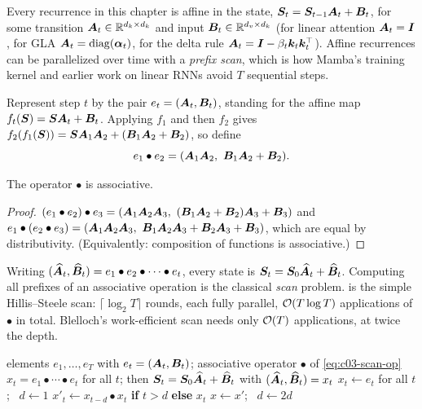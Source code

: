 Every recurrence in this chapter is affine in the state, $\bm{S}_t=\bm{S}_{t-1}\bm{A}_t+\bm{B}_t$, for some
transition $\bm{A}_t\in\mathbb{R}^{d_k\times d_k}$ and input $\bm{B}_t\in\mathbb{R}^{d_v\times d_k}$ (for linear
attention $\bm{A}_t=\bm{I}$, for GLA $\bm{A}_t=\operatorname{diag}(\bm{\alpha}_t)$, for the delta rule
$\bm{A}_t=\bm{I}-\beta_t\bm{k}_t\bm{k}_t^{\top}$). Affine recurrences can be parallelized over time with a
\emph{prefix scan}, which is how Mamba's training kernel and earlier work on linear RNNs
\citep{c03-martin2018parallelizing,c03-smith2023s5} avoid $T$ sequential steps.

Represent step $t$ by the pair $e_t=(\bm{A}_t,\bm{B}_t)$, standing for the affine map
$f_t(\bm{S})=\bm{S}\bm{A}_t+\bm{B}_t$. Applying $f_1$ and then $f_2$ gives
$f_2(f_1(\bm{S}))=\bm{S}\bm{A}_1\bm{A}_2+(\bm{B}_1\bm{A}_2+\bm{B}_2)$, so define
\begin{equation}\label{eq:c03-scan-op}
  e_1\bullet e_2=(\bm{A}_1\bm{A}_2,\ \bm{B}_1\bm{A}_2+\bm{B}_2).
\end{equation}

\begin{lemma}\label{lem:c03-assoc}
The operator $\bullet$ is associative.
\end{lemma}

\begin{proof}
$(e_1\bullet e_2)\bullet e_3=(\bm{A}_1\bm{A}_2\bm{A}_3,\ (\bm{B}_1\bm{A}_2+\bm{B}_2)\bm{A}_3+\bm{B}_3)$ and
$e_1\bullet(e_2\bullet e_3)=(\mA_1\mA_2\mA_3,\ \mB_1\mA_2\mA_3+\mB_2\mA_3+\mB_3)$, which are equal
by distributivity. (Equivalently: composition of functions is associative.)
\end{proof}

Writing $(\widehat{\bm{A}}_t,\widehat{\bm{B}}_t)=e_1\bullet e_2\bullet\cdots\bullet e_t$, every state is
$\bm{S}_t=\bm{S}_0\widehat{\bm{A}}_t+\widehat{\bm{B}}_t$. Computing all prefixes of an associative operation is
the classical \emph{scan} problem.  is the simple Hillis--Steele scan:
$\lceil\log_2T\rceil$ rounds, each fully parallel, $\mathcal{O}(T\log T)$ applications of $\bullet$
in total. Blelloch's work-efficient scan \citep{c03-blelloch1990prefix} needs only $\mathcal{O}(T)$
applications, at twice the depth.

\begin{algorithm}[t]
\caption{Inclusive parallel scan (Hillis--Steele) for affine recurrences}\label{alg:c03-scan}
\begin{algorithmic}[1]
\Require elements $e_1,\dots,e_T$ with $e_t=(\bm{A}_t,\bm{B}_t)$; associative operator $\bullet$ of \cref{eq:c03-scan-op}
\Ensure $x_t=e_1\bullet\cdots\bullet e_t$ for all $t$; then $\bm{S}_t=\bm{S}_0\widehat{\bm{A}}_t+\widehat{\bm{B}}_t$ with $(\widehat{\bm{A}}_t,\widehat{\bm{B}}_t)=x_t$
\State $x_t\gets e_t$ for all $t$; \ $d\gets1$
    \State $x'_t\gets x_{t-d}\bullet x_t$ \textbf{if} $t>d$ \textbf{else} $x_t$ 
  \EndFor
  \State $x\gets x'$; \ $d\gets2d$
\EndWhile
\end{algorithmic}
\end{algorithm}

